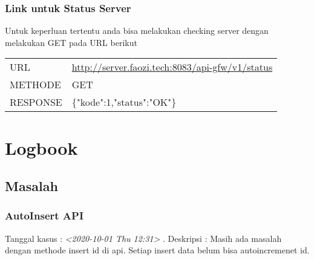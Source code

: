 \documentclass[11pt]{article}
\begin{document}
\subsubsection{Link untuk Status Server}
\label{sec:org021b112}
Untuk keperluan tertentu anda bisa melakukan checking server
dengan melakukan GET pada URL berikut
\begin{center}
\begin{tabular}{ll}
URL & \url{http://server.faozi.tech:8083/api-gfw/v1/status}\\
METHODE & GET\\
RESPONSE & \{"kode":1,"status":"OK"\}\\
\end{tabular}
\end{center}

\section{Logbook}
\label{sec:org37b6378}
\subsection{Masalah}
\label{sec:org5ae01e7}
\subsubsection{AutoInsert API}
\label{sec:org580f8c0}
Tanggal kasus : \textit{<2020-10-01 Thu 12:31> } . 
Deskripsi : Masih ada masalah dengan methode insert id di api. 
Setiap insert data belum bisa autoincremenet id. 
\end{document}
